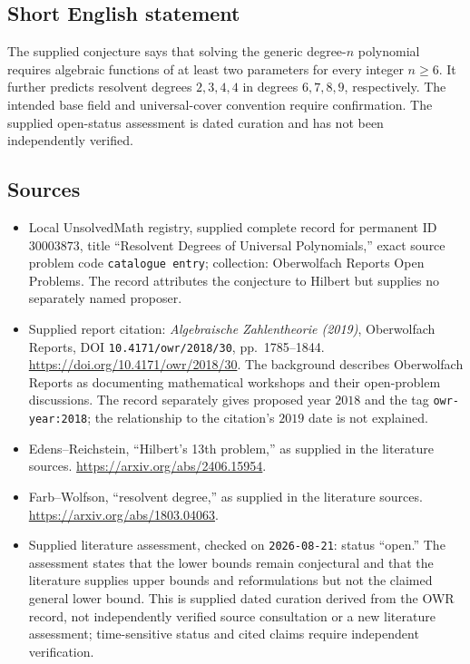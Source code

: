 \documentclass[11pt]{article}
\begin{document}
\subsection{Short English statement}
The supplied conjecture says that solving the generic degree-\(n\) polynomial requires algebraic functions of at least two parameters for every integer \(n\geq6\). It further predicts resolvent degrees \(2,3,4,4\) in degrees \(6,7,8,9\), respectively. The intended base field and universal-cover convention require confirmation. The supplied open-status assessment is dated curation and has not been independently verified.
\subsection{Sources}
\begin{itemize}
\item Local UnsolvedMath registry, supplied complete record for permanent ID \(30003873\), title ``Resolvent Degrees of Universal Polynomials,'' exact source problem code \texttt{catalogue entry}; collection: Oberwolfach Reports Open Problems. The record attributes the conjecture to Hilbert but supplies no separately named proposer.
\item Supplied report citation: \emph{Algebraische Zahlentheorie (2019)}, Oberwolfach Reports, DOI \texttt{10.4171/owr/2018/30}, pp.~1785--1844. \url{https://doi.org/10.4171/owr/2018/30}. The background describes Oberwolfach Reports as documenting mathematical workshops and their open-problem discussions. The record separately gives proposed year \(2018\) and the tag \texttt{owr-year:2018}; the relationship to the citation's \(2019\) date is not explained.
\item Edens--Reichstein, ``Hilbert's 13th problem,'' as supplied in the literature sources. \url{https://arxiv.org/abs/2406.15954}.
\item Farb--Wolfson, ``resolvent degree,'' as supplied in the literature sources. \url{https://arxiv.org/abs/1803.04063}.
\item Supplied literature assessment, checked on \texttt{2026-08-21}: status ``open.'' The assessment states that the lower bounds remain conjectural and that the literature supplies upper bounds and reformulations but not the claimed general lower bound. This is supplied dated curation derived from the OWR record, not independently verified source consultation or a new literature assessment; time-sensitive status and cited claims require independent verification.
\end{itemize}
\end{document}
